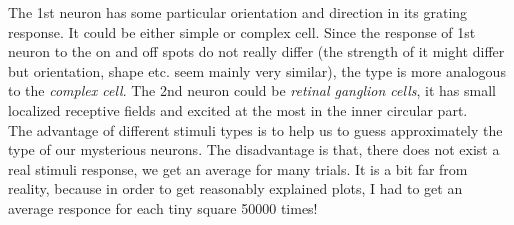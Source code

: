 \documentclass{article}
\begin{document}
The 1st neuron has some particular orientation and direction in its grating response. It could be either simple or complex cell. Since the response of 1st neuron to the on and off spots do not really differ (the strength of it might differ but orientation, shape etc. seem mainly very similar), the type is more analogous to the \textit{complex cell}. The 2nd neuron could be \textit{retinal ganglion cells}, it has small localized receptive fields and excited at the most in the inner circular part. \\

The advantage of different stimuli types is to help us to guess approximately the type of our mysterious neurons. The disadvantage is that, there does not exist a real stimuli response, we get an average for many trials. It is a bit far from reality, because in order to get reasonably explained plots, I had to get an average responce for each tiny square 50000 times! 
\end{document}
